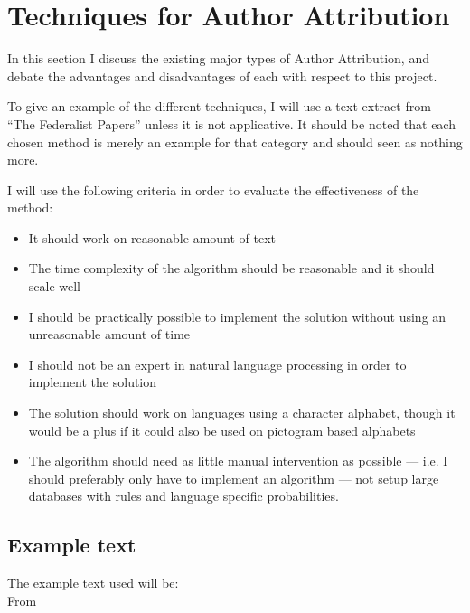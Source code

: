 \section{Techniques for Author Attribution}
\label{choiceMethod}
In this section I discuss the existing major types of Author Attribution, and debate the advantages and disadvantages of each with respect to this project.

To give an example of the different techniques, I will use a text extract from ``The Federalist Papers'' \cite{federalist} unless it is not applicative. It should be noted that each chosen method is merely an example for that category and should seen as nothing more.

I will use the following criteria in order to evaluate the effectiveness of the method:
\begin{itemize}
\item It should work on reasonable amount of text
\item The time complexity of the algorithm should be reasonable and it should scale well
\item I should be practically possible to implement the solution without using an unreasonable amount of time
\item I should not be an expert in natural language processing in order to implement the solution
\item The solution should work on languages using a character alphabet, though it would be a plus if it could also be used on pictogram based alphabets
\item The algorithm should need as little manual intervention as possible --- i.e. I should preferably only have to implement an algorithm --- not setup large databases with rules and language specific probabilities.  
\end{itemize}

\subsection*{Example text}
The example text used will be:\\
From \cite{federalist}

